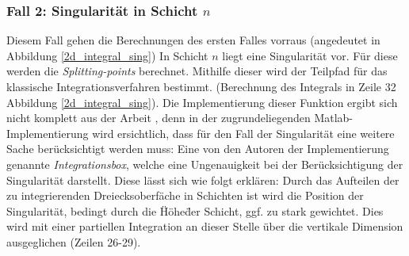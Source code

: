 \subsubsection*{Fall 2: Singularität in Schicht $n$}

Diesem Fall gehen die Berechnungen des ersten Falles vorraus (angedeutet in Abbildung \ref{2d_integral_sing})
In Schicht $n$ liegt eine Singularität vor. Für diese werden die \textit{Splitting-points} berechnet. Mithilfe dieser wird der Teilpfad für das klassische Integrationsverfahren bestimmt.
(Berechnung des Integrals in Zeile 32 Abbildung \ref{2d_integral_sing}).
Die Implementierung dieser Funktion ergibt sich nicht komplett aus der Arbeit \cite{gasperini:hal-03209144}, denn in der zugrundeliegenden Matlab-Implementierung wird ersichtlich, dass für den Fall der Singularität 
eine weitere Sache berücksichtigt werden muss: Eine von den Autoren der Implementierung genannte \textit{Integrationsbox}, welche eine Ungenauigkeit bei der Berücksichtigung der Singularität darstellt.
Diese lässt sich wie folgt erklären: Durch das Aufteilen der zu integrierenden Dreiecksoberfäche in Schichten ist wird die Position der Singularität, bedingt durch die \"Höhe\" der Schicht, ggf. zu stark gewichtet.
Dies wird mit einer partiellen Integration an dieser Stelle über die vertikale Dimension ausgeglichen (Zeilen 26-29).

\begin{center}
    
    \label{2d_integral_sing}
\end{center}
